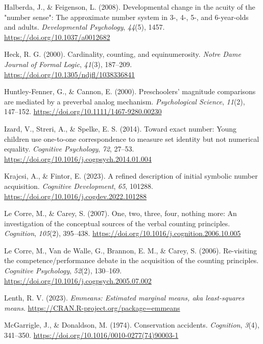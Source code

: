 \documentclass[
  man,floatsintext]{apa7}
\newlength{\cslhangindent}
\newlength{\cslentryspacingunit} %
\newenvironment{CSLReferences}[2] %
 {%
  \setlength{\parindent}{0pt}
  \ifodd #1
  \let\oldpar\par
  \def\par{\hangindent=\cslhangindent\oldpar}
  \fi
  \setlength{\parskip}{#2\cslentryspacingunit}
 }%
 {}
\begin{document}
\begin{CSLReferences}{1}{0}
\leavevmode{}%
Halberda, J., \& Feigenson, L. (2008). Developmental change in the acuity of the "number sense": The approximate number system in 3-, 4-, 5-, and 6-year-olds and adults. \emph{Developmental Psychology}, \emph{44}(5), 1457. \url{https://doi.org/10.1037/a0012682}

\leavevmode{}%
Heck, R. G. (2000). Cardinality, counting, and equinumerosity. \emph{Notre Dame Journal of Formal Logic}, \emph{41}(3), 187--209. \url{https://doi.org/10.1305/ndjfl/1038336841}

\leavevmode{}%
Huntley-Fenner, G., \& Cannon, E. (2000). Preschoolers' magnitude comparisons are mediated by a preverbal analog mechanism. \emph{Psychological Science}, \emph{11}(2), 147--152. \url{https://doi.org/10.1111/1467-9280.00230}

\leavevmode{}%
Izard, V., Streri, A., \& Spelke, E. S. (2014). Toward exact number: {Young} children use one-to-one correspondence to measure set identity but not numerical equality. \emph{Cognitive Psychology}, \emph{72}, 27--53. \url{https://doi.org/10.1016/j.cogpsych.2014.01.004}

\leavevmode{}%
Krajcsi, A., \& Fintor, E. (2023). A refined description of initial symbolic number acquisition. \emph{Cognitive Development}, \emph{65}, 101288. \url{https://doi.org/10.1016/j.cogdev.2022.101288}

\leavevmode{}%
Le Corre, M., \& Carey, S. (2007). One, two, three, four, nothing more: An investigation of the conceptual sources of the verbal counting principles. \emph{Cognition}, \emph{105}(2), 395--438. \url{https://doi.org/10.1016/j.cognition.2006.10.005}

\leavevmode{}%
Le Corre, M., Van de Walle, G., Brannon, E. M., \& Carey, S. (2006). Re-visiting the competence/performance debate in the acquisition of the counting principles. \emph{Cognitive Psychology}, \emph{52}(2), 130--169. \url{https://doi.org/10.1016/j.cogpsych.2005.07.002}

\leavevmode{}%
Lenth, R. V. (2023). \emph{Emmeans: Estimated marginal means, aka least-squares means}. \url{https://CRAN.R-project.org/package=emmeans}

\leavevmode{}%
McGarrigle, J., \& Donaldson, M. (1974). Conservation accidents. \emph{Cognition}, \emph{3}(4), 341--350. \url{https://doi.org/10.1016/0010-0277(74)90003-1}


\end{CSLReferences}
\end{document}
